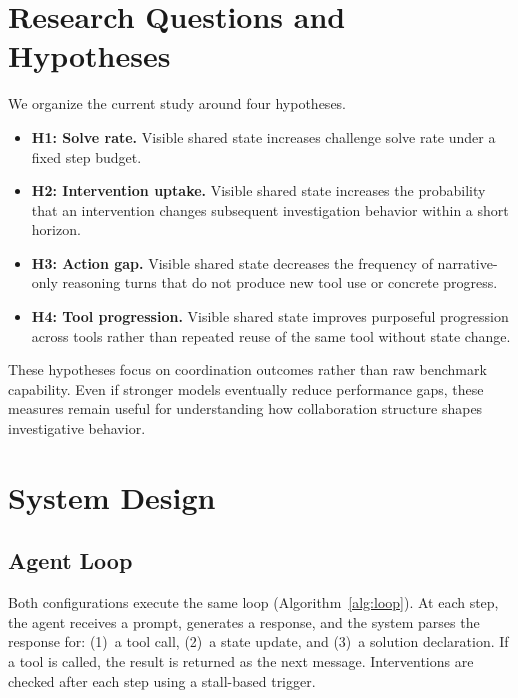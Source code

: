 \documentclass[letterpaper]{article}
\begin{document}
\section{Research Questions and Hypotheses}

We organize the current study around four hypotheses.

\begin{itemize}[leftmargin=1.2em]
    \item \textbf{H1: Solve rate.} Visible shared state increases challenge solve rate under a fixed step budget.
    \item \textbf{H2: Intervention uptake.} Visible shared state increases the probability that an intervention changes subsequent investigation behavior within a short horizon.
    \item \textbf{H3: Action gap.} Visible shared state decreases the frequency of narrative-only reasoning turns that do not produce new tool use or concrete progress.
    \item \textbf{H4: Tool progression.} Visible shared state improves purposeful progression across tools rather than repeated reuse of the same tool without state change.
\end{itemize}

These hypotheses focus on coordination outcomes rather than raw benchmark capability.
Even if stronger models eventually reduce performance gaps, these measures remain useful for understanding how collaboration structure shapes investigative behavior.

\section{System Design}

\subsection{Agent Loop}

Both configurations execute the same loop (Algorithm~\ref{alg:loop}).
At each step, the agent receives a prompt, generates a response, and the system parses the response for: (1)~a tool call, (2)~a state update, and (3)~a solution declaration.
If a tool is called, the result is returned as the next message.
Interventions are checked after each step using a stall-based trigger.
\end{document}
